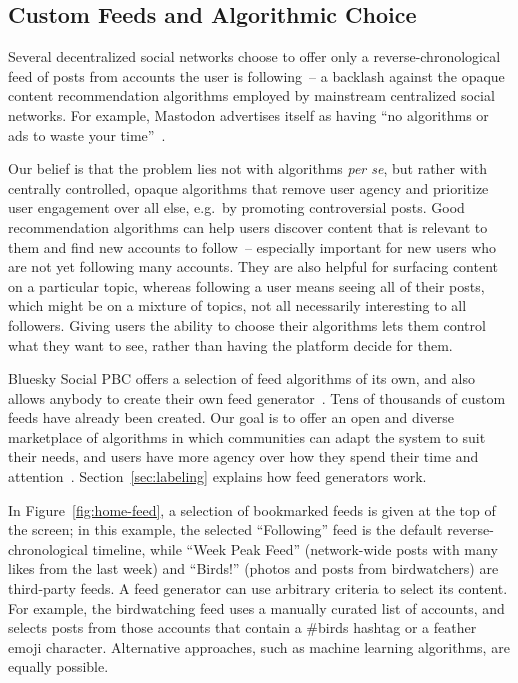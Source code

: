 \documentclass[sigconf,nonacm]{acmart}
\begin{document}
\subsection{Custom Feeds and Algorithmic Choice}\label{sec:feeds}

Several decentralized social networks choose to offer only a reverse-chronological feed of posts from accounts the user is following~-- a backlash against the opaque content recommendation algorithms employed by mainstream centralized social networks.
For example, Mastodon advertises itself as having ``no algorithms or ads to waste your time''~\cite{Mastodon}.

Our belief is that the problem lies not with algorithms \emph{per se}, but rather with centrally controlled, opaque algorithms that remove user agency and prioritize user engagement over all else, e.g.\ by promoting controversial posts.
Good recommendation algorithms can help users discover content that is relevant to them and find new accounts to follow~-- especially important for new users who are not yet following many accounts.
They are also helpful for surfacing content on a particular topic, whereas following a user means seeing all of their posts, which might be on a mixture of topics, not all necessarily interesting to all followers.
Giving users the ability to choose their algorithms lets them control what they want to see, rather than having the platform decide for them.

Bluesky Social PBC offers a selection of feed algorithms of its own, and also allows anybody to create their own feed generator~\cite{CustomFeeds}.
Tens of thousands of custom feeds have already been created.
Our goal is to offer an open and diverse marketplace of algorithms in which communities can adapt the system to suit their needs, and users have more agency over how they spend their time and attention~\cite{AlgorithmicChoice}.
Section~\ref{sec:labeling} explains how feed generators work.

In Figure~\ref{fig:home-feed}, a selection of bookmarked feeds is given at the top of the screen; in this example, the selected ``Following'' feed is the default reverse-chronological timeline, while ``Week Peak Feed'' (network-wide posts with many likes from the last week) and ``Birds!'' (photos and posts from birdwatchers) are third-party feeds.
A feed generator can use arbitrary criteria to select its content.
For example, the birdwatching feed uses a manually curated list of accounts, and selects posts from those accounts that contain a \#birds hashtag or a feather emoji character.
Alternative approaches, such as machine learning algorithms, are equally possible.
\end{document}
